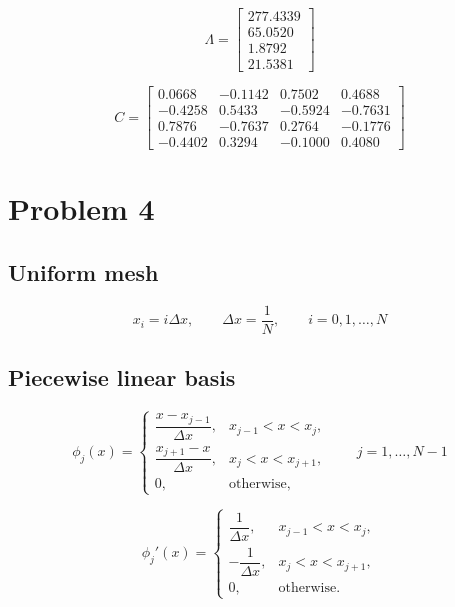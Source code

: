 \documentclass{article}
\begin{document}
\vspace{0.5cm}

\begin{tcolorbox}[title=Eigenvalues $\Lambda$]
\[
\Lambda =
\begin{bmatrix}
277.4339 \\
65.0520 \\
1.8792 \\
21.5381
\end{bmatrix}
\]
\end{tcolorbox}

\vspace{0.5cm}

\begin{tcolorbox}[title=Eigenvectors $C$]
\[
C =
\begin{bmatrix}
0.0668  & -0.1142 & 0.7502  & 0.4688 \\
-0.4258 & 0.5433  & -0.5924 & -0.7631 \\
0.7876  & -0.7637 & 0.2764  & -0.1776 \\
-0.4402 & 0.3294  & -0.1000 & 0.4080
\end{bmatrix}
\]
\end{tcolorbox}

\newpage

\section*{Problem 4}

\subsection*{Uniform mesh}

\[
x_i=i\Delta x,\qquad \Delta x=\dfrac1N,\qquad i=0,1,\dots ,N
\]

\subsection*{Piecewise linear basis}

\[
\phi_j(x)=
\begin{cases}
\dfrac{x-x_{j-1}}{\Delta x}, & x_{j-1}<x<x_j,\\[4pt]
\dfrac{x_{j+1}-x}{\Delta x}, & x_j<x<x_{j+1},\\[4pt]
0, & \text{otherwise},
\end{cases}
\qquad j=1,\dots ,N-1
\]

\[
\phi_j'(x)=
\begin{cases}
\dfrac1{\Delta x}, & x_{j-1}<x<x_j,\\[6pt]
-\dfrac1{\Delta x}, & x_j<x<x_{j+1},\\[6pt]
0, & \text{otherwise}.
\end{cases}
\]
\end{document}

